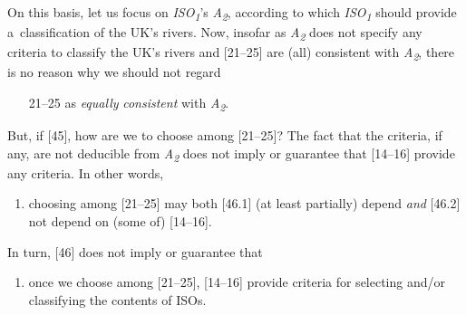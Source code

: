 On this basis, let us focus on \textit{ISO}\textit{\textsubscript{1}}'s \textit{A}\textit{\textsubscript{2}}, according to which \textit{ISO}\textit{\textsubscript{1}} should provide a~classification of the UK's rivers. Now, insofar as \textit{A}\textit{\textsubscript{2}} does not specify any criteria to classify the UK's rivers and [21–25] are (all) consistent with \textit{A}\textit{\textsubscript{2}}, there is no reason why we should not regard



\setcounter{saveenum}{\value{enumi}}

\begin{enumerate}

\setcounter{enumi}{\value{saveenum}}

\item [21–25] as \textit{equally} \textit{consistent} with \textit{A}\textit{\textsubscript{2}}.

\end{enumerate}

But, if [45], how are we to choose among [21–25]? The fact that the criteria, if any, are not deducible from \textit{A}\textit{\textsubscript{2}} does not imply or guarantee that [14–16] provide any criteria. In other words,



\setcounter{saveenum}{\value{enumi}}

\begin{enumerate}

\setcounter{enumi}{\value{saveenum}}

\item choosing among [21–25] may both [46.1] (at least partially) depend \textit{and} [46.2] not depend on (some of) [14–16].

\end{enumerate}

In turn, [46] does not imply or guarantee that



\setcounter{saveenum}{\value{enumi}}

\begin{enumerate}

\setcounter{enumi}{\value{saveenum}}

\item once we choose among [21–25], [14–16] provide criteria for selecting and/or classifying the contents of ISOs.

\end{enumerate}

